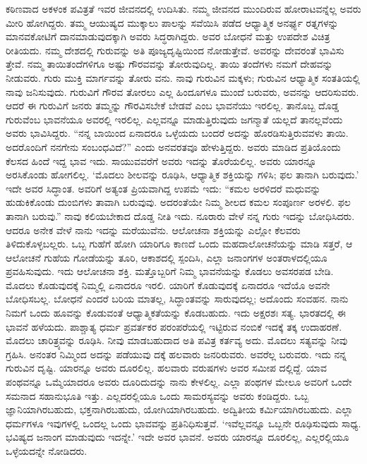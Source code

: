 ಕಠಿಣವಾದ ಅಕಳಂಕ ಪವಿತ್ರತೆ ಇವರ ಜೀವನದಲ್ಲಿ ಉದಿಸಿತು. ನಮ್ಮ ಜೀವನದ ಮುಂದಿರುವ ಹೋರಾಟವನ್ನೆಲ್ಲ ಅವರು ಮೀರಿ ಹೋಗಿದ್ದರು. ತಮ್ಮ ಆಯುಷ್ಯದ ಮುಕ್ಕಾಲು ಪಾಲನ್ನು ಸವೆಯಿಸಿ ಪಡೆದ ಆಧ್ಯಾತ್ಮಿಕ ಅನರ್ಘ್ಯ ರತ್ನಗಳನ್ನು ಮಾನವಕೋಟಿಗೆ ದಾನಮಾಡುವುದಕ್ಕಾಗಿ ಅವರು ಸಿದ್ಧರಾಗಿದ್ದರು. ಅವರ ಬೋಧನೆ ಮತ್ತು ಉಪದೇಶ ವಿಚಿತ್ರ ರೀತಿಯದು. ನಮ್ಮ ದೇಶದಲ್ಲಿ ಗುರುವನ್ನು ಅತಿ ಪೂಜ್ಯದೃಷ್ಟಿಯಿಂದ ನೋಡುತ್ತೇವೆ. ಅವರನ್ನು ದೇವರಂತೆ ಭಾವಿಸು ತ್ತೇವೆ. ನಮ್ಮ ತಾಯಿತಂದೆಗಳಿಗೂ ಅಷ್ಟು ಗೌರವವನ್ನು ತೋರುವುದಿಲ್ಲ. ತಾಯಿ ತಂದೆಗಳು ನಮಗೆ ದೇಹವನ್ನು ನೀಡುವರು. ಗುರು ಮುಕ್ತಿ ಮಾರ್ಗವನ್ನು ತೋರು ವನು. ನಾವು ಗುರುವಿನ ಮಕ್ಕಳು; ಗುರುವಿನ ಆಧ್ಯಾತ್ಮಿಕ ಸಂತತಿಯಲ್ಲಿ ನಾವು ಜನಿಸುವುದು. ಗುರುವಿಗೆ ಗೌರವ ತೋರಲು ಎಲ್ಲ ಹಿಂದೂಗಳೂ ಮುಂದೆ ಬರುವರು, ಅವನನ್ನು ಆದರಿಸುವರು. ಆದರೆ ಈ ಗುರುವಿಗೆ ಜನರು ತಮ್ಮನ್ನು ಗೌರವಿಸಬೇಕೆ ಬೇಡವೆ ಎಂಬ ಭಾವನೆಯು ಇರಲಿಲ್ಲ. ತಾನೊಬ್ಬ ದೊಡ್ಡ ಗುರುವೆಂಬ ಭಾವನೆಯೂ ಅವರಲ್ಲಿ ಇರಲಿಲ್ಲ. ಎಲ್ಲವನ್ನೂ ಮಾಡುತ್ತಿರುವುದು ಜಗನ್ಮಾತೆ ಯಲ್ಲದೆ ತಾನಲ್ಲವೆಂದು ಅವರು ಭಾವಿಸಿದ್ದರು. “ನನ್ನ ಬಾಯಿಂದ ಏನಾದರೂ ಒಳ್ಳೆಯದು ಬಂದರೆ ಅದನ್ನು ಹೊರಡಿಸುತ್ತಿರುವವಳು ತಾಯಿ. ಅದರೊಂದಿಗೆ ನನಗೇನು ಸಂಬಂಧವಿದೆ?” ಎಂದು ಅನವರತವೂ ಹೇಳುತ್ತಿದ್ದರು. ಅವರು ಮಾಡಿದ ಪ್ರತಿಯೊಂದು ಕೆಲಸದ ಹಿಂದೆ ಇದ್ದ ಭಾವ ಇದು. ಸಾಯುವವರೆಗೆ ಅವರು ಇದನ್ನು ತೊರೆಯಲಿಲ್ಲ. ಅವರು ಯಾರನ್ನೂ ಅರಸಿಕೊಂಡು ಹೋಗಲಿಲ್ಲ. ‘ಮೊದಲು ಶೀಲವನ್ನು ರೂಢಿಸಿ, ಆಧ್ಯಾತ್ಮಿಕ ಶಕ್ತಿಯನ್ನು ಗಳಿಸಿ; ಫಲ ತಾನಾಗಿ ಬರುವುದು.’ ಇದೇ ಅವರ ಸಿದ್ಧಾಂತ. ಅವರಿಗೆ ಅತ್ಯಂತ ಪ್ರಿಯವಾಗಿದ್ದ ಉಪಮೆ ಇದು: “ಕಮಲ ಅರಳಿದರೆ ಮಧುವನ್ನು ಹುಡುಕಿಕೊಂಡು ದುಂಬಿಗಳು ತಾವಾಗಿ ಬರುವುವು. ಅದರಂತೆಯೇ ನಿಮ್ಮ ಶೀಲದ ಕಮಲ ಸಂಪೂರ್ಣ ಅರಳಲಿ. ಫಲ ತಾನಾಗಿ ಬರುವು.” ನಾವು ಕಲಿಯಬೇಕಾದ ದೊಡ್ಡ ನೀತಿ ಇದು. ನೂರಾರು ವೇಳೆ ನನ್ನ ಗುರು ಇದನ್ನು ಬೋಧಿಸಿದರು. ಆದರೂ ಅನೇಕ ವೇಳೆ ನಾನು ಇದನ್ನು ಮರೆಯುವೆನು. ಆಲೋಚನಾ ಶಕ್ತಿಯನ್ನು ಎಲ್ಲೋ ಕೆಲವರು ತಿಳಿದುಕೊಳ್ಳಬಲ್ಲರು. ಒಬ್ಬ ಗುಹೆಗೆ ಹೋಗಿ ಯಾರಿಗೂ ಕಾಣದೆ ಒಂದು ಮಹದಾಲೋಚನೆಯನ್ನು ಮಾಡಿ ಸತ್ತರೆ, ಆ ಆಲೋಚನೆ ಗುಹೆಯ ಗೋಡೆಯನ್ನು ತೂರಿ, ಆಕಾಶದಲ್ಲಿ ಸ್ಪಂದಿಸಿ, ಎಲ್ಲಾ ಜನಾಂಗಗಳ ಅಂತರಾಳದಲ್ಲಿಯೂ ಪ್ರವಹಿಸುವುದು. ಇದು ಆಲೋಚನಾ ಶಕ್ತಿ. ಮತ್ತೊಬ್ಬರಿಗೆ ನಿಮ್ಮ ಭಾವನೆಯನ್ನು ಕೊಡಲು ಅವಸರಪಡ ಬೇಡಿ. ಮೊದಲು ಕೊಡುವುದಕ್ಕೆ ನಿಮ್ಮಲ್ಲಿ ಏನಾದರೂ ಇರಲಿ. ಯಾರಿಗೆ ಕೊಡುವುದಕ್ಕೆ ಏನಾದರೂ ಇದೆಯೊ ಅವನೇ ಬೋಧಿಸಬಲ್ಲ. ಬೋಧನೆ ಎಂದರೆ ಬರಿಯ ಮಾತಲ್ಲ, ಸಿದ್ಧಾಂತವನ್ನು ಸಾರುವುದಲ್ಲ; ಅದೊಂದು ಸಂವಹನ. ನಾನು ನಿಮಗೆ ಒಂದು ಹೂವನ್ನು ಕೊಡುವಂತೆ ಆಧ್ಯಾತ್ಮಿಕತೆಯನ್ನು ಕೊಡಬಹುದು. ಇದು ಅಕ್ಷರಶಃ ಸತ್ಯ. ಭಾರತದಲ್ಲಿ ಈ ಭಾವನೆ ಹಳೆಯದು. ಪಾಶ್ಚಾತ್ಯ ಧರ್ಮ ಪ್ರವರ್ತಕರ ಪರಂಪರೆಯಲ್ಲಿ ಇಟ್ಟಿರುವ ನಂಬಿಕೆ ಇದಕ್ಕೆ ತಕ್ಕ ಉದಾಹರಣೆ. ಮೊದಲು ಚಾರಿತ್ರ್ಯವನ್ನು ರೂಢಿಸಿ. ನೀವು ಮಾಡಬಹುದಾದ ಅತಿ ಪವಿತ್ರ ಕರ್ತವ್ಯ ಅದು. ಮೊದಲು ಸತ್ಯವನ್ನು ನೀವು ಗ್ರಹಿಸಿ. ಅನಂತರ ನಿಮ್ಮಿಂದ ಅದನ್ನು ಪಡೆಯುವು ದಕ್ಕೆ ಹಲವಾರು ಜನರಿರುವರು. ಅವರೆಲ್ಲ ಬರುವರು. ಇದು ನನ್ನ ಗುರುವಿನ ದೃಷ್ಟಿ. ಯಾರನ್ನೂ ಅವರು ದೂರಲಿಲ್ಲ. ಹಲವಾರು ವರುಷಗಳು ಅವರ ಸಮೀಪ ದಲ್ಲಿದ್ದೆ. ಯಾವ ಪಂಥವನ್ನೂ ಒಮ್ಮೆಯಾದರೂ ಅವರು ದೂರಿದುದನ್ನು ನಾನು ಕೇಳಲಿಲ್ಲ. ಎಲ್ಲಾ ಪಂಥಗಳ ಮೇಲೂ ಅವರಿಗೆ ಒಂದೇ ಸಮನಾದ ಸಹಾನುಭೂತಿ ಇತ್ತು. ಎಲ್ಲದರಲ್ಲಿಯೂ ಒಂದು ಸಾಮರಸ್ಯವನ್ನು ಅವರು ಕಂಡಿದ್ದರು. ಒಬ್ಬ ಜ್ಞಾನಿಯಾಗಿರಬಹುದು, ಭಕ್ತನಾಗಿರಬಹುದು, ಯೋಗಿಯಾಗಿರಬಹುದು. ಅದ್ವಿತೀಯ ಕರ್ಮಿಯಾಗಿರಬಹುದು. ಎಲ್ಲಾ ಧರ್ಮಗಳೂ ಇವುಗಳಲ್ಲಿ ಒಂದಲ್ಲ ಒಂದು ಭಾವವನ್ನು ಪ್ರತಿನಿಧಿಸುತ್ತವೆ. ‘ಇವೆಲ್ಲವನ್ನೂ ಒಬ್ಬನೇ ರೂಢಿಸುವುದು ಸಾಧ್ಯ. ಭವಿಷ್ಯದ ಜನಾಂಗ ಮಾಡುವುದು ಇದನ್ನೇ.’ ಇದೇ ಅವರ ಭಾವನೆ. ಅವರು ಯಾರನ್ನೂ ದೂರಲಿಲ್ಲ, ಎಲ್ಲರಲ್ಲಿಯೂ ಒಳ್ಳೆಯದನ್ನೇ ನೋಡಿದರು.

